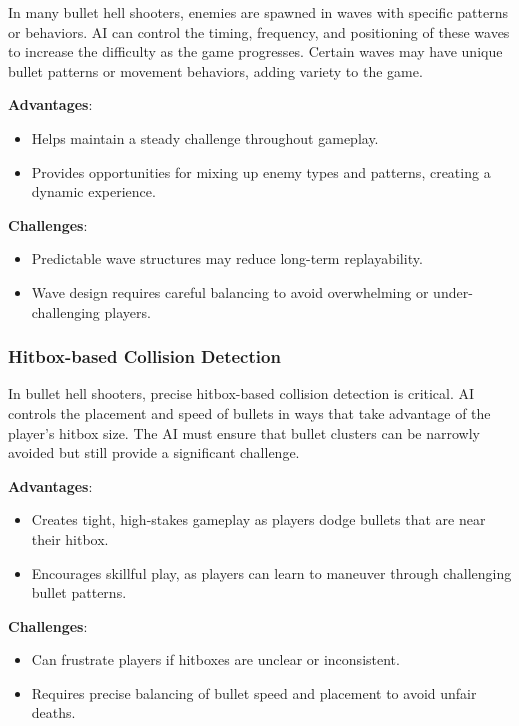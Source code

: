 In many bullet hell shooters, enemies are spawned in waves with specific patterns or behaviors. AI can control the timing, frequency, and positioning of these waves to increase the difficulty as the game progresses. Certain waves may have unique bullet patterns or movement behaviors, adding variety to the game.

\textbf{Advantages}:
\begin{itemize}
    \item Helps maintain a steady challenge throughout gameplay.
    \item Provides opportunities for mixing up enemy types and patterns, creating a dynamic experience.
\end{itemize}

\textbf{Challenges}:
\begin{itemize}
    \item Predictable wave structures may reduce long-term replayability.
    \item Wave design requires careful balancing to avoid overwhelming or under-challenging players.
\end{itemize}

\subsubsection{Hitbox-based Collision Detection}

In bullet hell shooters, precise hitbox-based collision detection is critical. AI controls the placement and speed of bullets in ways that take advantage of the player’s hitbox size. The AI must ensure that bullet clusters can be narrowly avoided but still provide a significant challenge.

\textbf{Advantages}:
\begin{itemize}
    \item Creates tight, high-stakes gameplay as players dodge bullets that are near their hitbox.
    \item Encourages skillful play, as players can learn to maneuver through challenging bullet patterns.
\end{itemize}

\textbf{Challenges}:
\begin{itemize}
    \item Can frustrate players if hitboxes are unclear or inconsistent.
    \item Requires precise balancing of bullet speed and placement to avoid unfair deaths.
\end{itemize}

